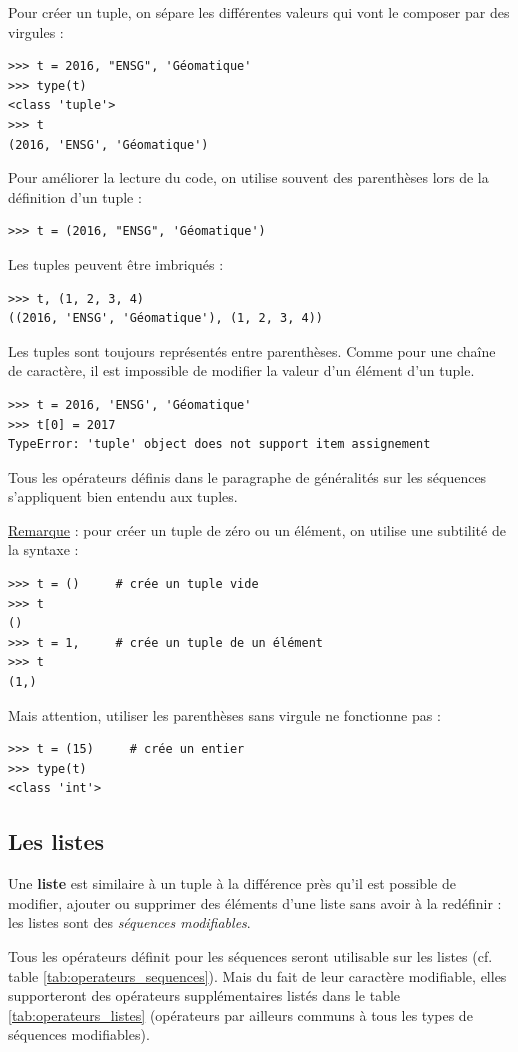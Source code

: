 \documentclass[12pt, a4paper]{article}
\begin{document}
Pour créer un tuple, on sépare les différentes valeurs qui vont le composer par des virgules :
\begin{lstlisting}
>>> t = 2016, "ENSG", 'Géomatique'
>>> type(t)
<class 'tuple'>
>>> t
(2016, 'ENSG', 'Géomatique')
\end{lstlisting}

Pour améliorer la lecture du code, on utilise souvent des parenthèses lors de la définition d'un tuple :
\begin{lstlisting}
>>> t = (2016, "ENSG", 'Géomatique')
\end{lstlisting}

Les tuples peuvent être imbriqués :
\begin{lstlisting}
>>> t, (1, 2, 3, 4)
((2016, 'ENSG', 'Géomatique'), (1, 2, 3, 4))
\end{lstlisting}

Les tuples sont toujours représentés entre parenthèses. Comme pour une chaîne de caractère, il est impossible de modifier la valeur d'un élément d'un tuple.
\begin{lstlisting}
>>> t = 2016, 'ENSG', 'Géomatique'
>>> t[0] = 2017
TypeError: 'tuple' object does not support item assignement
\end{lstlisting}

Tous les opérateurs définis dans le paragraphe de généralités sur les séquences s'appliquent bien entendu aux tuples.

\underline{Remarque} : pour créer un tuple de zéro ou un élément, on utilise une subtilité de la syntaxe :
\begin{lstlisting}
>>> t = ()     # crée un tuple vide
>>> t
()
>>> t = 1,     # crée un tuple de un élément
>>> t
(1,)
\end{lstlisting}
Mais attention, utiliser les parenthèses sans virgule ne fonctionne pas :
\begin{lstlisting}
>>> t = (15)     # crée un entier
>>> type(t)
<class 'int'>
\end{lstlisting}


\subsection{Les listes}
Une \textbf{liste} est similaire à un tuple à la différence près qu'il est possible de modifier, ajouter ou supprimer des éléments d'une liste sans avoir à la redéfinir : les listes sont des \textit{séquences modifiables}. 

Tous les opérateurs définit pour les séquences seront utilisable sur les listes (cf. table \ref{tab:operateurs_sequences}). Mais du fait de leur caractère modifiable, elles supporteront des opérateurs supplémentaires listés dans le table \ref{tab:operateurs_listes} (opérateurs par ailleurs communs à tous les types de séquences modifiables).
\end{document}
